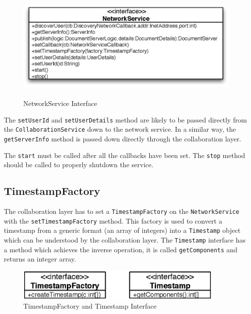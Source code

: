 \begin{figure}[H]
 \centering
 \includegraphics[width=13.83cm,height=5.57cm]{../images/finalreport/architecture_networkservice_uml.eps}
 \caption{NetworkService Interface}
 \label{fig:archoverview.networkservice}
\end{figure}

The \texttt{set\-User\-Id} and \texttt{set\-User\-Details} method are likely to
be passed directly from the \texttt{Collaboration\-Service} down to the
network service. In a similar way, the \texttt{get\-Server\-Info} method is
passed down directly through the collaboration layer.

The \texttt{start} must be called after all the callbacks have been set.
The \texttt{stop} method should be called to properly shutdown the service.


\subsection{TimestampFactory}
The collaboration layer has to set a \texttt{Timestamp\-Factory} on the
\texttt{NetworkService} with the \texttt{set\-Timestamp\-Factory} method. This
factory is used to convert a timestamp from a generic format (an array of
integers) into a \texttt{Timestamp} object which can be understood by the
collaboration layer. The \texttt{Timestamp} interface has a method which 
achieves the inverse operation, it is called \texttt{get\-Components} and
returns an integer array.

\begin{figure}[H]
 \centering
 \includegraphics[width=10.30cm,height=1.55cm]{../images/finalreport/architecture_timestampfactory_uml.eps}
 \caption{TimestampFactory and Timestamp Interface}
\end{figure}



